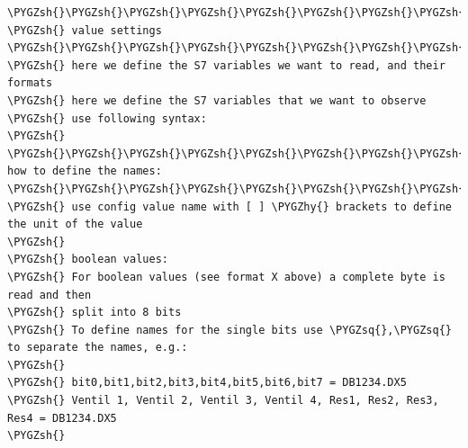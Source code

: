 \documentclass[a4paper,10pt,english]{sphinxmanual}
\def\PYGZsh{\char`\#}
\def\PYGZhy{\char`\-}
\def\PYGZsq{\char`\'}
\renewcommand\PYGZsq{\textquotesingle}
\begin{document}
\begin{Verbatim}[commandchars=\\\{\}]
\PYGZsh{}\PYGZsh{}\PYGZsh{}\PYGZsh{}\PYGZsh{}\PYGZsh{}\PYGZsh{}\PYGZsh{}\PYGZsh{}\PYGZsh{}\PYGZsh{}\PYGZsh{}\PYGZsh{}\PYGZsh{}\PYGZsh{}\PYGZsh{}\PYGZsh{}\PYGZsh{}\PYGZsh{}\PYGZsh{}\PYGZsh{}\PYGZsh{}\PYGZsh{}\PYGZsh{}\PYGZsh{}\PYGZsh{}\PYGZsh{}\PYGZsh{}\PYGZsh{}\PYGZsh{}\PYGZsh{}\PYGZsh{}\PYGZsh{}\PYGZsh{}\PYGZsh{}\PYGZsh{}\PYGZsh{}\PYGZsh{}\PYGZsh{}\PYGZsh{}\PYGZsh{}\PYGZsh{}\PYGZsh{}\PYGZsh{}\PYGZsh{}\PYGZsh{}\PYGZsh{}\PYGZsh{}\PYGZsh{}\PYGZsh{}\PYGZsh{}\PYGZsh{}\PYGZsh{}\PYGZsh{}\PYGZsh{}\PYGZsh{}\PYGZsh{}\PYGZsh{}\PYGZsh{}\PYGZsh{}\PYGZsh{}\PYGZsh{}\PYGZsh{}\PYGZsh{}\PYGZsh{}\PYGZsh{}\PYGZsh{}\PYGZsh{}\PYGZsh{}\PYGZsh{}\PYGZsh{}\PYGZsh{}
\PYGZsh{} value settings
\PYGZsh{}\PYGZsh{}\PYGZsh{}\PYGZsh{}\PYGZsh{}\PYGZsh{}\PYGZsh{}\PYGZsh{}\PYGZsh{}\PYGZsh{}\PYGZsh{}\PYGZsh{}\PYGZsh{}\PYGZsh{}\PYGZsh{}\PYGZsh{}\PYGZsh{}\PYGZsh{}\PYGZsh{}\PYGZsh{}\PYGZsh{}\PYGZsh{}\PYGZsh{}\PYGZsh{}\PYGZsh{}\PYGZsh{}\PYGZsh{}\PYGZsh{}\PYGZsh{}\PYGZsh{}\PYGZsh{}\PYGZsh{}\PYGZsh{}\PYGZsh{}\PYGZsh{}\PYGZsh{}\PYGZsh{}\PYGZsh{}\PYGZsh{}\PYGZsh{}\PYGZsh{}\PYGZsh{}\PYGZsh{}\PYGZsh{}\PYGZsh{}\PYGZsh{}\PYGZsh{}\PYGZsh{}\PYGZsh{}\PYGZsh{}\PYGZsh{}\PYGZsh{}\PYGZsh{}\PYGZsh{}\PYGZsh{}\PYGZsh{}\PYGZsh{}\PYGZsh{}\PYGZsh{}\PYGZsh{}\PYGZsh{}\PYGZsh{}\PYGZsh{}\PYGZsh{}\PYGZsh{}\PYGZsh{}\PYGZsh{}\PYGZsh{}\PYGZsh{}\PYGZsh{}\PYGZsh{}\PYGZsh{}
\PYGZsh{} here we define the S7 variables we want to read, and their formats
\PYGZsh{} here we define the S7 variables that we want to observe
\PYGZsh{} use following syntax:
\PYGZsh{}
\PYGZsh{}\PYGZsh{}\PYGZsh{}\PYGZsh{}\PYGZsh{}\PYGZsh{}\PYGZsh{}\PYGZsh{}\PYGZsh{} how to define the names: \PYGZsh{}\PYGZsh{}\PYGZsh{}\PYGZsh{}\PYGZsh{}\PYGZsh{}\PYGZsh{}\PYGZsh{}\PYGZsh{}\PYGZsh{}\PYGZsh{}\PYGZsh{}\PYGZsh{}\PYGZsh{}\PYGZsh{}\PYGZsh{}\PYGZsh{}\PYGZsh{}\PYGZsh{}\PYGZsh{}\PYGZsh{}\PYGZsh{}\PYGZsh{}\PYGZsh{}\PYGZsh{}\PYGZsh{}\PYGZsh{}\PYGZsh{}\PYGZsh{}\PYGZsh{}\PYGZsh{}\PYGZsh{}\PYGZsh{}\PYGZsh{}\PYGZsh{}\PYGZsh{}\PYGZsh{}\PYGZsh{}\PYGZsh{}\PYGZsh{}
\PYGZsh{} use config value name with [ ] \PYGZhy{} brackets to define the unit of the value
\PYGZsh{}
\PYGZsh{} boolean values:
\PYGZsh{} For boolean values (see format X above) a complete byte is read and then
\PYGZsh{} split into 8 bits
\PYGZsh{} To define names for the single bits use \PYGZsq{},\PYGZsq{} to separate the names, e.g.:
\PYGZsh{}
\PYGZsh{} bit0,bit1,bit2,bit3,bit4,bit5,bit6,bit7 = DB1234.DX5
\PYGZsh{} Ventil 1, Ventil 2, Ventil 3, Ventil 4, Res1, Res2, Res3, Res4 = DB1234.DX5
\PYGZsh{}

\end{Verbatim}
\end{document}
